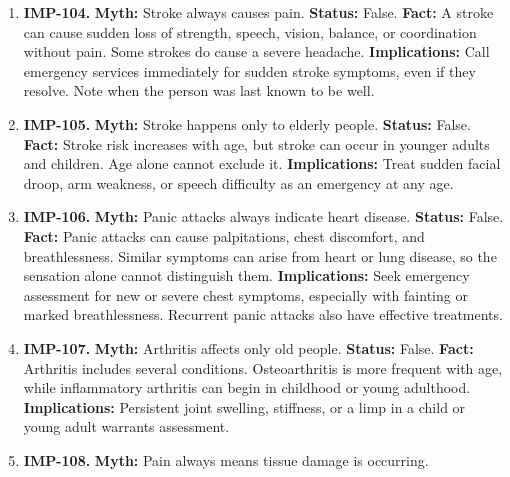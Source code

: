 \documentclass[11pt,oneside]{book}
\begin{document}
\begin{enumerate}[leftmargin=0pt,labelwidth=0pt,labelsep=0pt,itemindent=0pt]
\hypertarget{stroke-warning-signs}{}
\item[] \textbf{IMP-104.} \textbf{Myth:} Stroke always causes pain.\newline
\textbf{Status:} False.\newline
\textbf{Fact:} A stroke can cause sudden loss of strength, speech, vision, balance, or coordination without pain. Some strokes do cause a severe headache. \cite{ref438}\newline
\textbf{Implications:} Call emergency services immediately for sudden stroke symptoms, even if they resolve. Note when the person was last known to be well.
\item[] \textbf{IMP-105.} \textbf{Myth:} Stroke happens only to elderly people.\newline
\textbf{Status:} False.\newline
\textbf{Fact:} Stroke risk increases with age, but stroke can occur in younger adults and children. Age alone cannot exclude it. \cite{ref438}\newline
\textbf{Implications:} Treat sudden facial droop, arm weakness, or speech difficulty as an emergency at any age.
\item[] \textbf{IMP-106.} \textbf{Myth:} Panic attacks always indicate heart disease.\newline
\textbf{Status:} False.\newline
\textbf{Fact:} Panic attacks can cause palpitations, chest discomfort, and breathlessness. Similar symptoms can arise from heart or lung disease, so the sensation alone cannot distinguish them. \cite{ref232}\newline
\textbf{Implications:} Seek emergency assessment for new or severe chest symptoms, especially with fainting or marked breathlessness. Recurrent panic attacks also have effective treatments.
\item[] \textbf{IMP-107.} \textbf{Myth:} Arthritis affects only old people.\newline
\textbf{Status:} False.\newline
\textbf{Fact:} Arthritis includes several conditions. Osteoarthritis is more frequent with age, while inflammatory arthritis can begin in childhood or young adulthood. \cite{ref439}\newline
\textbf{Implications:} Persistent joint swelling, stiffness, or a limp in a child or young adult warrants assessment.
\item[] \textbf{IMP-108.} \textbf{Myth:} Pain always means tissue damage is occurring.\newline

\end{enumerate}
\end{document}
